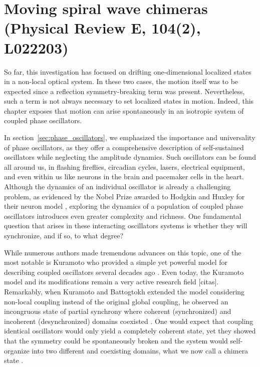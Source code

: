 \chapter{Moving spiral wave chimeras (Physical Review E, 104(2), L022203)}

So far, this investigation has focused on drifting one-dimensional localized states in a non-local optical system. 
In these two cases, the motion itself was to be expected since a reflection
symmetry-breaking term was present. Nevertheless, such a term is not always
necessary to set localized states in motion. Indeed, this chapter exposes that motion can arise spontaneously
in an isotropic system of coupled phase oscillators.

In section~\ref{sec:phase_oscillators}, we emphasized the importance
and universality of phase oscillators, as they offer a comprehensive
description of self-sustained oscillators while neglecting the amplitude 
dynamics. Such oscillators can be found all around us,
in flashing fireflies, circadian cycles, lasers, electrical equipment, and even within us
like neurons in the brain and pacemaker cells in the heart. Although the dynamics
of an individual oscillator is already a challenging problem, as evidenced
by the Nobel Prize awarded to Hodgkin and Huxley for their neuron model
\cite{hodgkin1952quantitative},
exploring the dynamics of a population of coupled phase oscillators
introduces even greater complexity and richness. One fundamental question that
arises in these interacting oscillators systems is whether they will synchronize, 
and if so, to what degree?

While numerous authors made tremendous advances on this topic, one of the
most notable is Kuramoto who provided a simple yet powerful model 
for describing coupled oscillators several decades ago \cite{kuramoto1975model}. Even today, the Kuramoto
model and its modifications remain a very active research field [citas].
Remarkably, when Kuramoto and Battogtokh extended the model considering non-local coupling instead
of the original global coupling, he observed an incongruous state
of partial synchrony where coherent (synchronized) and incoherent (desynchronized) domains coexisted \cite{kuramoto2002coexistence}.
One would expect that coupling identical oscillators would only yield a completely coherent
state, yet they showed that the symmetry could be spontaneously broken and the system
would self-organize into two different and coexisting domains, what we now call a chimera state \cite{abrams2004chimera}.

